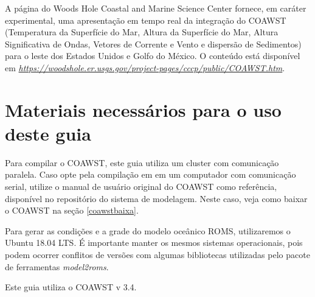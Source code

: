 \noindent A página do Woods Hole Coastal and Marine Science Center fornece, em caráter experimental, uma apresentação em 
          tempo real da integração do COAWST (Temperatura da Superfície do Mar, Altura da Superfície do Mar, Altura Significativa
          de Ondas, Vetores de Corrente e Vento e dispersão de Sedimentos) para o leste dos Estados Unidos e Golfo do México.
          O conteúdo está disponível em \textcolor{bleu_cite}{\href{https://woodshole.er.usgs.gov/project-pages/cccp/public/COAWST.htm}{\textit{https://woodshole.er.usgs.gov/project-pages/cccp/public/COAWST.htm}}}.
\bigskip

\section{Materiais necessários para o uso deste guia}
\bigskip

\noindent Para compilar o COAWST, este guia utiliza um cluster com comunicação paralela. Caso opte pela compilação em 
          em um computador com comunicação serial, utilize o manual de usuário original do COAWST como referência, disponível no repositório do sistema de modelagem. Neste caso, 
          veja como baixar o COAWST na seção \textcolor{bleu_cite}{\ref{coawstbaixa}}.
\bigskip

\noindent Para gerar as condições e a grade do modelo oceânico ROMS, utilizaremos o Ubuntu 18.04 LTS. É importante manter os mesmos sistemas
          operacionais, pois podem ocorrer conflitos de versões com algumas bibliotecas utilizadas pelo pacote de ferramentas \textit{model2roms}.
\bigskip

\begin{tcolorbox}[enhanced,
    grow to left by=0cm,%
    grow to right by=0cm,%
    enlarge top by=0cm,%
    enlarge bottom by=0cm,%
    tcbox raise base,
    boxrule=1.0pt,
    left=18mm,
    colframe=red!50!black,coltext=red!25!black,colback=red!10!white,
    overlay={\begin{tcbclipinterior}\fill[red!75!blue!50!white] (frame.south west)
      rectangle node[text=white,font=\sffamily\bfseries\footnotesize,rotate=0] {ATENÇÃO} ([xshift=18mm]frame.north west);\end{tcbclipinterior}}]
  Este guia utiliza o COAWST v 3.4.
  \end{tcolorbox}
  \bigskip